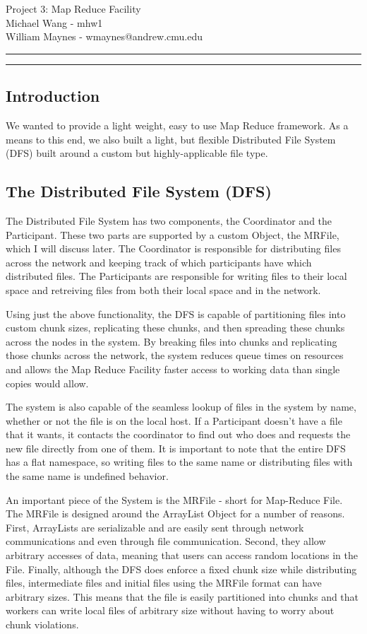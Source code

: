 \documentclass[11pt]{article}
\makeatletter
\newcounter{questionCounter}
\newcounter{partCounter}[questionCounter]
\newenvironment{question}[2][\arabic{questionCounter}]{%
    \setcounter{partCounter}{0}%
    \vspace{.25in} \hrule \vspace{0.5em}%
        \noindent{\bf #2}%
    \vspace{0.8em} \hrule \vspace{.10in}%
    \addtocounter{questionCounter}{1}%
}{}
\newcommand{\myandrew}{William Maynes - wmaynes@andrew.cmu.edu}
\newcommand{\partnerandrew}{Michael Wang - mhw1}
\newcommand{\myhwname}{Project 3: Map Reduce Facility}
\makeatother
\begin{document}
\thispagestyle{plain}

{\Large \myhwname} \\
\partnerandrew \\
\myandrew \\

\begin{question}{Section 1 - Design} 
\subsection*{Introduction}
We wanted to provide a light weight, easy to use Map Reduce framework. As a means to this end, we also built a light, but flexible Distributed File System (DFS) built around a custom but highly-applicable file type. 

\subsection*{The Distributed File System (DFS)}
The Distributed File System has two components, the Coordinator and the Participant. These two parts are supported by a custom Object, the MRFile, which I will discuss later. The Coordinator is responsible for distributing files across the network and keeping track of which participants have which distributed files. The Participants are responsible for writing files to their local space and retreiving files from both their local space and in the network.

Using just the above functionality, the DFS is capable of partitioning files into custom chunk sizes, replicating these chunks, and then spreading these chunks across the nodes in the system. By breaking files into chunks and replicating those chunks across the network, the system reduces queue times on resources and allows the Map Reduce Facility faster access to working data than single copies would allow. 

The system is also capable of the seamless lookup of files in the system by name, whether or not the file is on the local host. If a Participant doesn't have a file that it wants, it contacts the coordinator to find out who does and requests the new file directly from one of them. It is important to note that the entire DFS has a flat namespace, so writing files to the same name or distributing files with the same name is undefined behavior.

An important piece of the System is the MRFile - short for Map-Reduce File. The MRFile is designed around the ArrayList Object for a number of reasons. First, ArrayLists are serializable and are easily sent through network communications and even through file communication. Second, they allow arbitrary accesses of data, meaning that users can access random locations in the File. Finally, although the DFS does enforce a fixed chunk size while distributing files, intermediate files and initial files using the MRFile format can have arbitrary sizes. This means that the file is easily partitioned into chunks and that workers can write local files of arbitrary size without having to worry about chunk violations.


\end{question}
\end{document}
